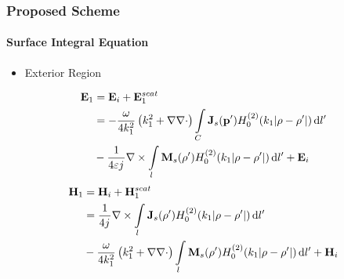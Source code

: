 \documentclass[mathserif,16pt,xcolor=table]{beamer}
\begin{document}
\begin{frame}
  \frametitle{Proposed Scheme}
  \framesubtitle{Surface Integral Equation}
  \vspace*{-.4cm}
  \begin{itemize}
    \item{Exterior Region}
  \end{itemize}
  \begin{equation} \nonumber
    \begin{split}
      \mathbf{E}_1 &= \mathbf{E}_i + \mathbf{E}_1^{scat} \\
      &=  -\frac{\omega}{4 k_1^2} \left( k_1^2 + \nabla \nabla \cdot \right) \int\limits_{C} \mathbf{J}_s(\mathbf{p}') H_0^{(2)}(k_1 |\mathbf{\rho} - \mathbf{\rho}'|) \mathop{}\!\mathrm{d}{l'} \\
      &- \frac{1}{4 \varepsilon {j}\mkern1mu} \nabla \times \int\limits_{l} \mathbf{M}_s(\mathbf{\rho}') H_0^{(2)}(k_1 |\mathbf{\rho} - \mathbf{\rho}'|) \mathop{}\!\mathrm{d}{l'} + \mathbf{E}_i
    \end{split}
    \label{eq:E1sc}
  \end{equation}
  \begin{equation} \nonumber
    \begin{split}
      \mathbf{H}_1 &= \mathbf{H}_i + \mathbf{H}_1^{scat} \\
      &= \frac{1}{4 {j}\mkern1mu} \nabla \times \int\limits_{l} \mathbf{J}_s(\mathbf{\rho}') H_0^{(2)}(k_1 |\mathbf{\rho} - \mathbf{\rho}'|) \mathop{}\!\mathrm{d}{l'} \\
      &-\frac{\omega}{4 k_1^2} \left( k_1^2 + \nabla \nabla \cdot \right) \int\limits_{l} \mathbf{M}_s(\mathbf{\rho}') H_0^{(2)}(k_1 |\mathbf{\rho} - \mathbf{\rho}'|) \mathop{}\!\mathrm{d}{l'} + \mathbf{H}_i
    \end{split}
    \label{eq:H1sc}
  \end{equation}
\end{frame}
\end{document}
